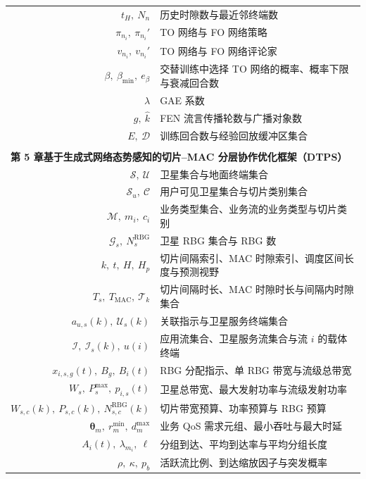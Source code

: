 \begin{nomenclature}
\begin{longtable}{rl}
  $t_H,\ N_n$                          & 历史时隙数与最近邻终端数 \\
  $\pi_{n_i},\ \pi_{n_i}'$             & TO 网络与 FO 网络策略 \\
  $v_{n_i},\ v_{n_i}'$                 & TO 网络与 FO 网络评论家 \\
  $\beta,\ \beta_{\min},\ e_\beta$      & 交替训练中选择 TO 网络的概率、概率下限与衰减回合数 \\
  $\lambda$                            & GAE 系数 \\
  $g,\ \hat{k}$                        & FEN 流言传播轮数与广播对象数 \\
  $E,\ \mathcal{D}$                    & 训练回合数与经验回放缓冲区集合 \\
  \\[2pt]
  \multicolumn{2}{l}{\textbf{第 5 章\quad 基于生成式网络态势感知的切片--MAC 分层协作优化框架（DTPS）}} \\[2pt]
  $\mathcal S,\ \mathcal U$            & 卫星集合与地面终端集合 \\
  $\mathcal S_u,\ \mathcal C$          & 用户可见卫星集合与切片类别集合 \\
  $\mathcal M,\ m_i,\ c_i$             & 业务类型集合、业务流的业务类型与切片类别 \\
  $\mathcal G_s,\ N_s^{\mathrm{RBG}}$  & 卫星 RBG 集合与 RBG 数 \\
  $k,\ t,\ H,\ H_p$                    & 切片间隔索引、MAC 时隙索引、调度区间长度与预测视野 \\
  $T_s,\ T_{\mathrm{MAC}},\ \mathcal T_k$ & 切片间隔时长、MAC 时隙时长与间隔内时隙集合 \\
  $a_{u,s}(k),\ \mathcal U_s(k)$       & 关联指示与卫星服务终端集合 \\
  $\mathcal I,\ \mathcal I_s(k),\ u(i)$ & 应用流集合、卫星服务流集合与流 $i$ 的载体终端 \\
  $x_{i,s,g}(t),\ B_g,\ B_i(t)$        & RBG 分配指示、单 RBG 带宽与流级总带宽 \\
  $W_s,\ P_s^{\max},\ p_{i,s}(t)$      & 卫星总带宽、最大发射功率与流级发射功率 \\
  $W_{s,c}(k),\ P_{s,c}(k),\ N_{s,c}^{\mathrm{RBG}}(k)$ & 切片带宽预算、功率预算与 RBG 预算 \\
  $\boldsymbol\theta_m,\ r_m^{\min},\ d_m^{\max}$ & 业务 QoS 需求元组、最小吞吐与最大时延 \\
  $A_i(t),\ \lambda_{m_i},\ \ell$      & 分组到达、平均到达率与平均分组长度 \\
  $\rho,\ \kappa,\ p_b$                & 活跃流比例、到达缩放因子与突发概率 \\

\end{longtable}
\end{nomenclature}
